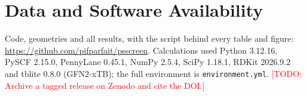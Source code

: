 \documentclass[journal=jctcce,manuscript=article]{achemso}
\newcommand{\todo}[1]{\textcolor{red}{[TODO: #1]}}
\begin{document}
\section*{Data and Software Availability}
\sloppy
Code, geometries and all results, with the script behind every table and figure:
\url{https://github.com/pifparfait/psscreen}. Calculations used Python 3.12.16, PySCF 2.15.0, PennyLane 0.45.1,
NumPy 2.5.4, SciPy 1.18.1, RDKit 2026.9.2 and tblite 0.8.0 (GFN2-xTB); the full environment is \texttt{environment.yml}. \todo{Archive a tagged
release on Zenodo and cite the DOI.}


\end{document}
